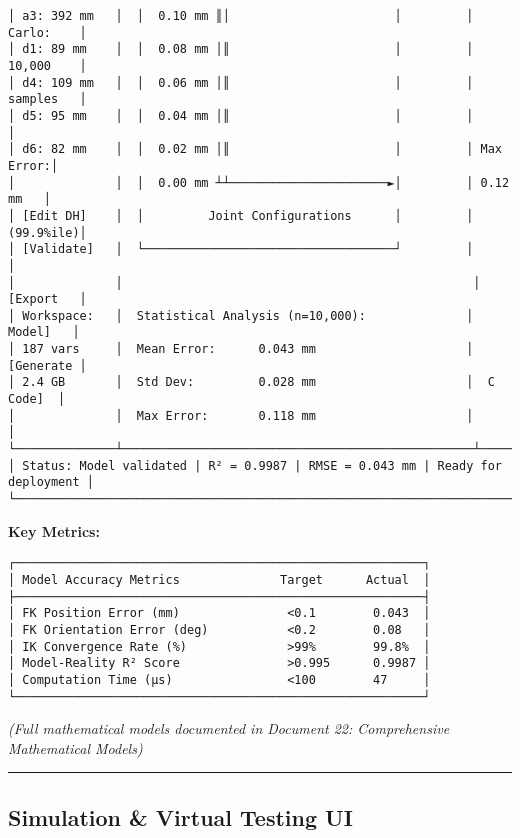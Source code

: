 \documentclass[
]{article}
\begin{document}
\begin{verbatim}
│ a3: 392 mm   │  │  0.10 mm ║│                       │         │ Carlo:    │
│ d1: 89 mm    │  │  0.08 mm │║                       │         │ 10,000    │
│ d4: 109 mm   │  │  0.06 mm │║                       │         │ samples   │
│ d5: 95 mm    │  │  0.04 mm │║                       │         │           │
│ d6: 82 mm    │  │  0.02 mm │║                       │         │ Max Error:│
│              │  │  0.00 mm ┴┴──────────────────────►│         │ 0.12 mm   │
│ [Edit DH]    │  │         Joint Configurations      │         │ (99.9%ile)│
│ [Validate]   │  └───────────────────────────────────┘         │           │
│              │                                                 │ [Export   │
│ Workspace:   │  Statistical Analysis (n=10,000):              │  Model]   │
│ 187 vars     │  Mean Error:      0.043 mm                     │ [Generate │
│ 2.4 GB       │  Std Dev:         0.028 mm                     │  C Code]  │
│              │  Max Error:       0.118 mm                     │           │
└──────────────┴─────────────────────────────────────────────────┴───────────┘
│ Status: Model validated | R² = 0.9987 | RMSE = 0.043 mm | Ready for deployment │
└────────────────────────────────────────────────────────────────────────────┘
\end{verbatim}

\textbf{Key Metrics:}

\begin{verbatim}
┌─────────────────────────────────────────────────────────┐
│ Model Accuracy Metrics              Target      Actual  │
├─────────────────────────────────────────────────────────┤
│ FK Position Error (mm)               <0.1        0.043  │
│ FK Orientation Error (deg)           <0.2        0.08   │
│ IK Convergence Rate (%)              >99%        99.8%  │
│ Model-Reality R² Score               >0.995      0.9987 │
│ Computation Time (µs)                <100        47     │
└─────────────────────────────────────────────────────────┘
\end{verbatim}

\emph{(Full mathematical models documented in Document 22: Comprehensive
Mathematical Models)}

\begin{center}\rule{0.5\linewidth}{0.5pt}\end{center}

\hypertarget{simulation-virtual-testing-ui}{%
\subsection{Simulation \& Virtual Testing
UI}\label{simulation-virtual-testing-ui}}
\end{document}
